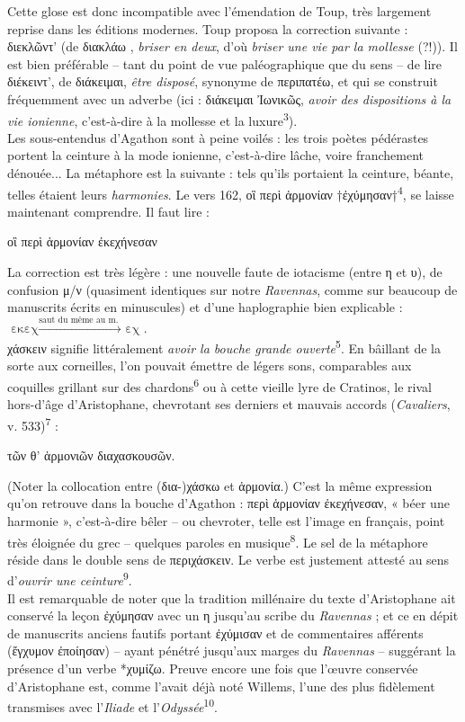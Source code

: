 \documentclass[12pt]{book}%
\newcommand{\italique}[1]{\textit{#1}}%
\newcommand{\citComm}[1]{\begin{quoting}[vskip=0pt] #1 \end{quoting}}%
\newlength{\larg}%
\newcommand{\marqueur}[1]{\textsuperscript{#1}}%
\newenvironment{groupe}{%
\pstart%
\ledgroup%
}{%
\pend %
}%
\begin{document}
\begin{pages}
\begin{Leftside}
\begin{groupe}
{{Cette glose est donc incompatible avec l'émendation de Toup, très largement reprise dans les éditions modernes. Toup proposa la correction suivante : διεκλῶντ' (de διακλάω , \italique{briser en deux}, d'où \italique{briser une vie par la mollesse} (?!)).
Il est bien préférable -- tant du point de vue paléographique que du sens -- de lire διέκειντ', de διάκειμαι, \italique{être disposé}, synonyme de περιπατέω, et qui se construit fréquemment avec un adverbe (ici : διάκειμαι Ἰωνικῶς, \italique{avoir des dispositions à la vie ionienne}, c'est-à-dire à la mollesse et la luxure\marqueur{3}).\\
Les sous-entendus d'Agathon sont à peine voilés : les trois poètes pédérastes portent la ceinture à la mode ionienne, c'est-à-dire lâche, voire franchement dénouée...
La métaphore est la suivante : tels qu'ils portaient la ceinture, béante, telles étaient leurs \italique{harmonies}. Le vers 162, οἳ περὶ ἁρμονίαν †ἐχύμησαν†\marqueur{4}, se laisse maintenant comprendre. Il faut lire :%
\citComm{οἳ περὶ ἁρμονίαν ἐκεχήνεσαν}%
La correction est très légère : une nouvelle faute de iotacisme (entre η et υ), de confusion μ/ν (quasiment identiques sur notre \italique{Ravennas}, comme sur beaucoup de manuscrits écrits en minuscules) et d'une haplographie bien explicable :  $\text{εκεχ} \xrightarrow{\text{saut du même au m. }} \text{ εχ}$.\\
χάσκειν signifie littéralement \italique{avoir la bouche grande ouverte}\marqueur{5}. En bâillant de la sorte aux corneilles, l'on pouvait émettre de légers sons, comparables aux coquilles grillant sur des chardons\marqueur{6} ou à cette vieille lyre de Cratinos, le rival hors-d'âge d'Aristophane, chevrotant ses derniers et mauvais accords (\italique{Cavaliers}, v. 533)\marqueur{7} :%
\citComm{τῶν θ' ἁρμονιῶν διαχασκουσῶν.}%
(Noter la collocation entre (δια-)χάσκω et ἁρμονία.)  C'est la même expression qu'on retrouve dans la bouche d'Agathon : περὶ ἁρμονίαν ἐκεχήνεσαν, « béer une harmonie », c'est-à-dire bêler -- ou chevroter, telle est l'image en français, point très éloignée du grec -- quelques paroles en musique\marqueur{8}. Le sel de la métaphore réside dans le double sens de περιχάσκειν. Le verbe est justement attesté au sens d'\italique{ouvrir une ceinture}\marqueur{9}.\\
Il est remarquable de noter que la tradition millénaire du texte d'Aristophane ait conservé la leçon ἐχύμησαν avec un η jusqu'au scribe du \italique{Ravennas} ; et ce en dépit de manuscrits anciens fautifs portant ἐχύμισαν et de commentaires afférents (ἔγχυμον ἐποίησαν) -- ayant pénétré jusqu'aux marges du \italique{Ravennas} -- suggérant la présence d'un verbe *χυμίζω. Preuve encore une fois que l'œuvre conservée d'Aristophane est, comme l'avait déjà noté Willems, l'une des plus fidèlement transmises avec l'\italique{Iliade} et l'\italique{Odyssée}\marqueur{10}.
}}
\end{groupe}
\end{Leftside}
\end{pages}
\end{document}
